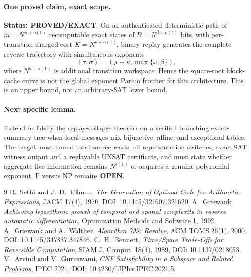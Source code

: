\documentclass[11pt]{article}
\newcommand{\Status}[1]{\textbf{Status: #1.}}
\begin{document}
\paragraph{One proved claim, exact scope.}
\Status{PROVED/EXACT} On an authenticated deterministic path of $m=N^{\mu+o(1)}$ recomputable exact
states of $B=N^{\beta+o(1)}$ bits, with per-transition charged cost
$K=N^{\kappa+o(1)}$, binary replay generates the complete reverse trajectory with simultaneous
exponents
\[
(\tau,\sigma)=(\mu+\kappa,\max\{\omega,\beta\}),
\]
where $N^{\omega+o(1)}$ is additional transition workspace.  Hence the square-root block-cache curve
is not the global exponent Pareto frontier for this architecture.  This is an upper bound, not an
arbitrary-SAT lower bound.

\paragraph{Next specific lemma.}
Extend or falsify the replay-collapse theorem on a verified branching exact-summary tree when local
messages mix bijunctive, affine, and exceptional tables.  The target must bound total source reads,
all representation switches, exact SAT witness output and a replayable UNSAT certificate, and must
state whether aggregate live information remains $N^{o(1)}$ or acquires a genuine polynomial
exponent.  P versus NP remains \textbf{OPEN}.

\begin{thebibliography}{9}
 R.~Sethi and J.~D.~Ullman, \emph{The Generation of Optimal Code for Arithmetic
Expressions}, JACM 17(4), 1970, DOI: 10.1145/321607.321620.
 A.~Griewank, \emph{Achieving logarithmic growth of temporal and spatial complexity in
reverse automatic differentiation}, Optimization Methods and Software 1, 1992.
 A.~Griewank and A.~Walther, \emph{Algorithm 799: Revolve}, ACM TOMS 26(1), 2000,
DOI: 10.1145/347837.347846.
 C.~H.~Bennett, \emph{Time/Space Trade-Offs for Reversible Computation}, SIAM J.
Comput. 18(4), 1989, DOI: 10.1137/0218053.
 V.~Arvind and V.~Guruswami, \emph{CNF Satisfiability in a Subspace and Related
Problems}, IPEC 2021, DOI: 10.4230/LIPIcs.IPEC.2021.5.
\end{thebibliography}

\end{document}
